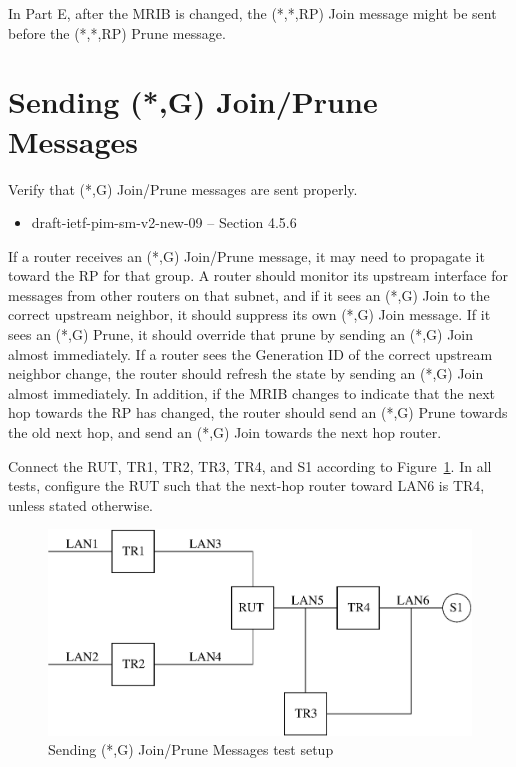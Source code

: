 \documentclass[11pt]{report}
\begin{document}
In Part E, after the MRIB is changed, the (*,*,RP) Join message might
be sent before the (*,*,RP) Prune message.

\newpage
\section{Sending (*,G) Join/Prune Messages}

Verify that (*,G) Join/Prune messages are sent properly.

\begin{itemize}
  \item draft-ietf-pim-sm-v2-new-09 -- Section 4.5.6
\end{itemize}

If a router receives an (*,G) Join/Prune message, it may need to propagate
it toward the RP for that group. A router should monitor its upstream
interface for messages
from other routers on that subnet, and if it sees an (*,G) Join to the
correct upstream neighbor, it should suppress its own (*,G) Join message.
If it sees an (*,G) Prune, it should override that prune by sending an
(*,G) Join almost immediately. If a router sees the Generation ID of the
correct upstream neighbor change, the router should refresh the state by
sending an (*,G) Join almost immediately. In addition, if the MRIB changes
to indicate that the next hop towards the RP has changed, the router should
send an (*,G) Prune towards the old next hop, and send an (*,G) Join
towards the next hop router.

Connect the RUT, TR1, TR2, TR3, TR4, and S1 according to
Figure~\ref{fig:pim_test_4_6_sending_wc_join_prune_messages}.
In all tests, configure the RUT such that the next-hop router toward LAN6 is
TR4, unless stated otherwise.

\begin{figure}[htbp]
  \begin{center}
    \includegraphics[scale=0.8]{figs/pim_test_4_6_sending_wc_join_prune_messages}
    \caption{Sending (*,G) Join/Prune Messages test setup}
    \label{fig:pim_test_4_6_sending_wc_join_prune_messages}
  \end{center}
\end{figure}
\end{document}
